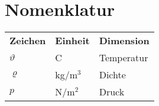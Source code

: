\chapter{Nomenklatur} \label{vor:nomenklatur}


\renewcommand{\arraystretch}{1.25} %
\begin{longtable}{p{} p{} p{}}
	\textbf{\textsf{Zeichen}} & \textbf{\textsf{Einheit}} & \textbf{\textsf{Dimension}} \vspace{1ex} \\
	$\vartheta$               & C                         & Temperatur 	\\
	$\varrho$                 & kg/m$^3$                  & Dichte		\\
	$p$                       & N/m$^2$                   & Druck
\end{longtable}
\renewcommand{\arraystretch}{1} %